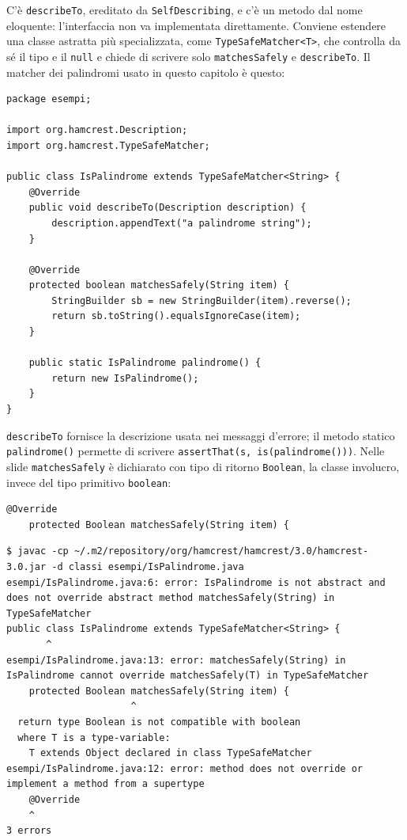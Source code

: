 C'è \texttt{describeTo}, ereditato da \texttt{SelfDescribing}, e c'è un metodo dal nome eloquente: l'interfaccia non va
implementata direttamente. Conviene estendere una classe astratta più specializzata, come \texttt{TypeSafeMatcher<T>},
che controlla da sé il tipo e il \texttt{null} e chiede di scrivere solo \texttt{matchesSafely} e \texttt{describeTo}.
Il matcher dei palindromi usato in questo capitolo è questo:

\begin{lstlisting}[style=java, name=IsPalindrome.java]
package esempi;

import org.hamcrest.Description;
import org.hamcrest.TypeSafeMatcher;

public class IsPalindrome extends TypeSafeMatcher<String> {
    @Override
    public void describeTo(Description description) {
        description.appendText("a palindrome string");
    }

    @Override
    protected boolean matchesSafely(String item) {
        StringBuilder sb = new StringBuilder(item).reverse();
        return sb.toString().equalsIgnoreCase(item);
    }

    public static IsPalindrome palindrome() {
        return new IsPalindrome();
    }
}
\end{lstlisting}

\texttt{describeTo} fornisce la descrizione usata nei messaggi d'errore; il metodo statico \texttt{palindrome()}
permette di scrivere \texttt{assertThat(s, is(palindrome()))}. Nelle slide \texttt{matchesSafely} è dichiarato con tipo
di ritorno \texttt{Boolean}, la classe involucro, invece del tipo primitivo \texttt{boolean}:

\begin{lstlisting}[style=java, name=IsPalindrome.java, firstnumber=12]
    @Override
    protected Boolean matchesSafely(String item) {
\end{lstlisting}

\begin{lstlisting}[style=shell, name=Terminale, deletekeywords={java}]
$ javac -cp ~/.m2/repository/org/hamcrest/hamcrest/3.0/hamcrest-3.0.jar -d classi esempi/IsPalindrome.java
esempi/IsPalindrome.java:6: error: IsPalindrome is not abstract and does not override abstract method matchesSafely(String) in TypeSafeMatcher
public class IsPalindrome extends TypeSafeMatcher<String> {
       ^
esempi/IsPalindrome.java:13: error: matchesSafely(String) in IsPalindrome cannot override matchesSafely(T) in TypeSafeMatcher
    protected Boolean matchesSafely(String item) {
                      ^
  return type Boolean is not compatible with boolean
  where T is a type-variable:
    T extends Object declared in class TypeSafeMatcher
esempi/IsPalindrome.java:12: error: method does not override or implement a method from a supertype
    @Override
    ^
3 errors
\end{lstlisting}

